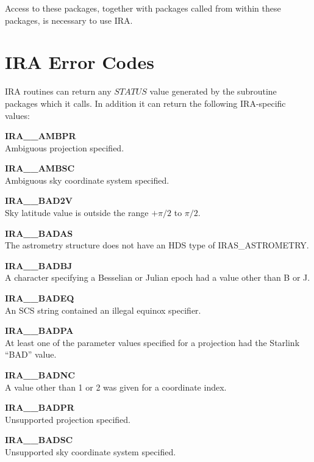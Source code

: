 Access to these packages, together with packages called from within these
packages, is necessary to use IRA.

\section {IRA Error Codes}
\label {APP:ERRORS}
IRA routines can return any $STATUS$ value generated by the subroutine packages
which it calls. In addition it can return the following IRA-specific values:

\begin{description}

\item {\bf IRA\_\_AMBPR   }\\
Ambiguous projection specified.

\item {\bf IRA\_\_AMBSC   }\\
Ambiguous sky coordinate system specified.

\item {\bf IRA\_\_BAD2V   }\\
Sky latitude value is outside the range $+\pi/2$ to $\pi/2$.

\item {\bf IRA\_\_BADAS   }\\
The astrometry structure does not have an HDS type of IRAS\_ASTROMETRY.

\item {\bf IRA\_\_BADBJ   }\\
A character specifying a Besselian or Julian epoch had a value other than B or J.

\item {\bf IRA\_\_BADEQ   }\\
An SCS string contained an illegal equinox specifier.

\item {\bf IRA\_\_BADPA   }\\
At least one of the parameter values specified for a projection had the
Starlink ``BAD'' value.

\item {\bf IRA\_\_BADNC   }\\
A value other than 1 or 2 was given for a coordinate index.

\item {\bf IRA\_\_BADPR   }\\
Unsupported projection specified.

\item {\bf IRA\_\_BADSC   }\\
Unsupported sky coordinate system specified.


\end{description}
